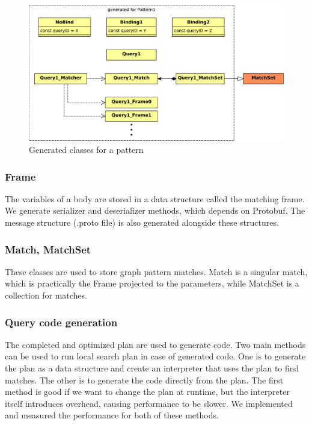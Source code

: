 \begin{figure}[h]
	\begin{center}
		\includegraphics[width=\textwidth]{figures/generated-code-structure-perpattern.pdf}
		\caption{Generated classes for a pattern}
		\label{fig:generated-code-structure-perpattern}
	\end{center}
\end{figure}


\subsubsection{Frame}

The variables of a body are stored in a data structure called the matching frame.
We generate serializer and deserializer methods, which depends on Protobuf.
The message structure (.proto file) is also generated alongside these structures.

\subsubsection{Match, MatchSet}

These classes are used to store graph pattern matches. Match is a singular match, which is practically the Frame projected to the parameters, while MatchSet is a collection for matches.

\subsubsection{Query code generation}

The completed and optimized plan are used to generate \cpp{} code. 
Two main methods can be used to run local search plan in case of generated code. 
One is to generate the plan as a data structure and create an interpreter that uses the plan to find matches. 
The other is to generate the code directly from the plan. 
The first method is good if we want to change the plan at runtime, but the interpreter itself introduces overhead, causing performance to be slower.
We implemented and measured the performance for both of these methods.

